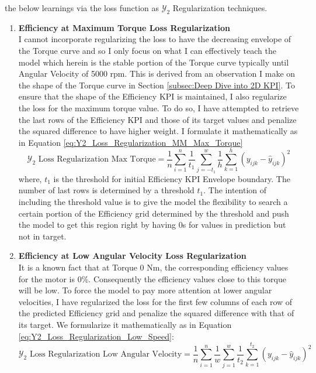 \documentclass{report} %
\begin{document}
\begin{enumerate}
the below learnings via the loss function as $\mathcal{Y}_2$ Regularization techniques.
\begin{enumerate}
\item \textbf{Efficiency at Maximum Torque Loss Regularization} \\
I cannot incorporate regularizing the loss to have the decreasing envelope of the Torque curve and so I only focus on what I can effectively teach the model which 
herein is the stable portion of the Torque curve typically until Angular Velocity of 5000 rpm. This is derived from an observation I make on the shape of the Torque 
curve in Section \ref{subsec:Deep Dive into 2D KPI}.
To ensure that the shape of the Efficiency \ac{KPI} is maintained, I also regularize the loss for the maximum torque value.
To do so, I have attempted to retrieve the last rows of the Efficiency \ac{KPI} and those of its target values and penalize the squared difference to have higher weight.
I formulate it mathematically as in Equation \ref{eq:Y2_Loss_Regularization_MM_Max_Torque}
\begin{equation}
    \text{$\mathcal{Y}_2$ Loss Regularization Max Torque} = \frac{1}{n} \sum_{i=1}^{n} \frac{1}{t_{1}} \sum_{j=-t_{1}}^{w} \frac{1}{h} \sum_{k=1}^{h} (y_{ijk} - \hat{y}_{ijk})^2
    \label{eq:Y2_Loss_Regularization_MM_Max_Torque}
\end{equation}
where, \(t_{1}\) is the threshold for initial Efficiency \ac{KPI} Envelope boundary. The number of last rows is determined by a threshold $t_{1}$.
The intention of including the threshold value is to give the model the flexibility to search a certain portion of the Efficiency grid determined by the threshold and 
push the model to get this region right by having 0s for values in prediction but not in target.
\item \textbf{Efficiency at Low Angular Velocity Loss Regularization} \\
It is a known fact that at Torque 0 Nm, the corresponding efficiency values for the motor is 0\%. Consequently the efficiency values close to this torque will be low.
To force the model to pay more attention at lower angular velocities, I have regularized the loss for the first few columns of each row of the predicted Efficiency grid 
and penalize the squared difference with that of its target. We formularize it mathematically as in Equation \ref{eq:Y2_Loss_Regularization_Low_Speed}:
\begin{equation}
    \text{$\mathcal{Y}_2$ Loss Regularization Low Angular Velocity} = \frac{1}{n} \sum_{i=1}^{n} \frac{1}{w} \sum_{j=1}^{w} \frac{1}{t_{2}} \sum_{k=1}^{t_{2}} (y_{ijk} - \hat{y}_{ijk})^2

\end{equation}
\end{enumerate}
\end{enumerate}
\end{document}
